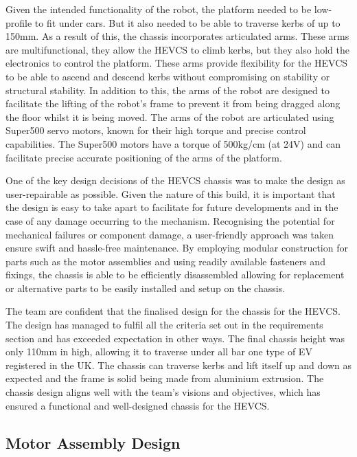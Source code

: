 \documentclass [12pt]{article}
\begin{document}
Given the intended functionality of the robot, the platform needed to be low-profile to fit under cars. But it also needed to be able to traverse kerbs of up to 150mm. As a result of this, the chassis incorporates articulated arms. These arms are multifunctional, they allow the HEVCS to climb kerbs, but they also hold the electronics to control the platform. These arms provide flexibility for the HEVCS to be able to ascend and descend kerbs without compromising on stability or structural stability. In addition to this, the arms of the robot are designed to facilitate the lifting of the robot’s frame to prevent it from being dragged along the floor whilst it is being moved. The arms of the robot are articulated using Super500 servo motors, known for their high torque and precise control capabilities. The Super500 motors have a torque of 500kg/cm (at 24V) and can facilitate precise accurate positioning of the arms of the platform.

One of the key design decisions of the HEVCS chassis was to make the design as user-repairable as possible. Given the nature of this build, it is important that the design is easy to take apart to facilitate for future developments and in the case of any damage occurring to the mechanism. Recognising the potential for mechanical failures or component damage, a user-friendly approach was taken ensure swift and hassle-free maintenance. By employing modular construction for parts such as the motor assemblies and using readily available fasteners and fixings, the chassis is able to be efficiently disassembled allowing for replacement or alternative parts to be easily installed and setup on the chassis.

The team are confident that the finalised design for the chassis for the HEVCS. The design has managed to fulfil all the criteria set out in the requirements section and has exceeded expectation in other ways. The final chassis height was only 110mm in high, allowing it to traverse under all bar one type of EV registered in the UK. The chassis can traverse kerbs and lift itself up and down as expected and the frame is solid being made from aluminium extrusion. The chassis design aligns well with the team's visions and objectives, which has ensured a functional and well-designed chassis for the HEVCS.

\subsection{Motor Assembly Design}
\end{document}
